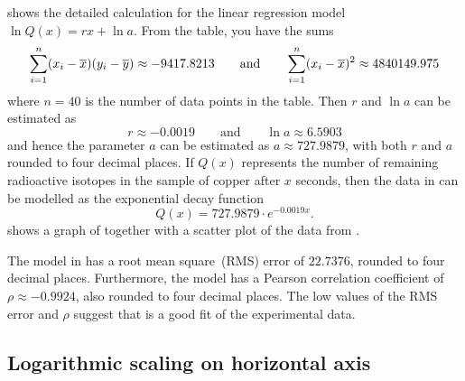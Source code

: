 \documentclass[a4paper,oneside,12pt]{article}
\begin{document}
{\begin{solution}
 shows the detailed
calculation for the linear regression model
$\ln Q(x) = rx + \ln a$.  From the table, you have the sums
\[
\sum_{i=1}^n (x_i - \overline{x}) (y_i - \overline{y})
\approx
-9417.8213
\qquad
\text{and}
\qquad
\sum_{i=1}^n (x_i - \overline{x})^2
\approx
4840149.975
\]
where $n = 40$ is the number of data points in the table.  Then $r$
and $\ln a$ can be estimated as
\[
r
\approx
-0.0019
\qquad
\text{and}
\qquad
\ln a
\approx
6.5903
\]
and hence the parameter $a$ can be estimated as
$a \approx 727.9879$, with both $r$ and $a$ rounded to four decimal
places.  If $Q(x)$ represents the number of remaining radioactive
isotopes in the sample of copper after $x$ seconds, then the data in
 can be modelled as the
exponential decay function
\begin{equation}
\label{eqn:logarithm:copper_decay_model}
Q(x)
=
727.9879 \cdot e^{-0.0019 x}.
\end{equation}
 shows a
graph of  together with a
scatter plot of the data from
.

The model in  has a root
mean square~(RMS) error of $22.7376$, rounded to four decimal places.
Furthermore, the model has a Pearson correlation coefficient of
$\rho \approx -0.9924$, also rounded to four decimal places.  The low
values of the RMS error and $\rho$ suggest that
 is a good fit of the
experimental data.
\end{solution}
}{}



\subsection{Logarithmic scaling on horizontal axis}
\end{document}
